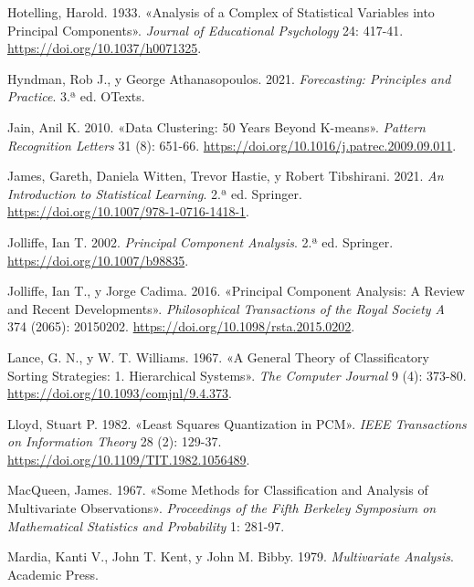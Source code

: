 \documentclass[
  spanish,
  10.5pt,
  letterpaper,
  DIV=11,
  numbers=noendperiod,
  oneside,
  open=any]{scrreprt}
\newlength{\cslhangindent}
\newenvironment{CSLReferences}[2] %
 {\begin{list}{}{%
  \setlength{\itemindent}{0pt}
  \setlength{\leftmargin}{0pt}
  \setlength{\parsep}{0pt}
  \ifodd #1
   \setlength{\leftmargin}{\cslhangindent}
   \setlength{\itemindent}{-1\cslhangindent}
  \fi
  \setlength{\itemsep}{#2\baselineskip}}}
 {\end{list}}
\theoremstyle{definition}
\theoremstyle{definition}
\theoremstyle{plain}
\theoremstyle{remark}
\begin{document}
\begin{CSLReferences}{1}{1}
Hotelling, Harold. 1933. {«Analysis of a Complex of Statistical
Variables into Principal Components»}. \emph{Journal of Educational
Psychology} 24: 417-41. \url{https://doi.org/10.1037/h0071325}.

Hyndman, Rob J., y George Athanasopoulos. 2021. \emph{Forecasting:
Principles and Practice}. 3.ª ed. OTexts.

Jain, Anil K. 2010. {«Data Clustering: 50 Years Beyond K-means»}.
\emph{Pattern Recognition Letters} 31 (8): 651-66.
\url{https://doi.org/10.1016/j.patrec.2009.09.011}.

James, Gareth, Daniela Witten, Trevor Hastie, y Robert Tibshirani. 2021.
\emph{An Introduction to Statistical Learning}. 2.ª ed. Springer.
\url{https://doi.org/10.1007/978-1-0716-1418-1}.

Jolliffe, Ian T. 2002. \emph{Principal Component Analysis}. 2.ª ed.
Springer. \url{https://doi.org/10.1007/b98835}.

Jolliffe, Ian T., y Jorge Cadima. 2016. {«Principal Component Analysis:
A Review and Recent Developments»}. \emph{Philosophical Transactions of
the Royal Society A} 374 (2065): 20150202.
\url{https://doi.org/10.1098/rsta.2015.0202}.

Lance, G. N., y W. T. Williams. 1967. {«A General Theory of
Classificatory Sorting Strategies: 1. Hierarchical Systems»}. \emph{The
Computer Journal} 9 (4): 373-80.
\url{https://doi.org/10.1093/comjnl/9.4.373}.

Lloyd, Stuart P. 1982. {«Least Squares Quantization in PCM»}. \emph{IEEE
Transactions on Information Theory} 28 (2): 129-37.
\url{https://doi.org/10.1109/TIT.1982.1056489}.

MacQueen, James. 1967. {«Some Methods for Classification and Analysis of
Multivariate Observations»}. \emph{Proceedings of the Fifth Berkeley
Symposium on Mathematical Statistics and Probability} 1: 281-97.

Mardia, Kanti V., John T. Kent, y John M. Bibby. 1979.
\emph{Multivariate Analysis}. Academic Press.


\end{CSLReferences}
\end{document}
